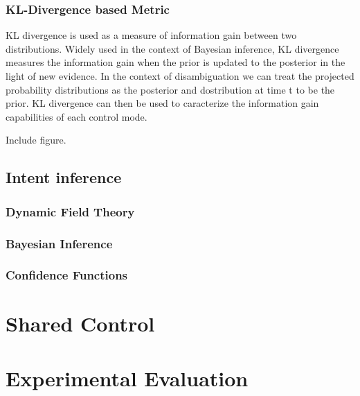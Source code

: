\documentclass[conference]{IEEEtran}
\begin{document}
\subsubsection{KL-Divergence based Metric}
KL divergence is used as a measure of information gain between two distributions. Widely used in the context of Bayesian inference, KL divergence measures the information gain when the prior is updated to the posterior in the light of new evidence. In the context of disambiguation we can treat the projected probability distributions as the posterior and dostribution at time t to be the prior. KL divergence can then be used to caracterize the information gain capabilities of each control mode. 

Include figure. 

\subsection{Intent inference}\label{ssec:inference}
\subsubsection{Dynamic Field Theory}
\subsubsection{Bayesian Inference}
\subsubsection{Confidence Functions}

\section{Shared Control}\label{sec:shared-control}

\section{Experimental Evaluation}\label{sec:ed}
\end{document}

